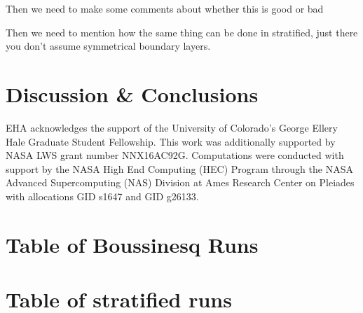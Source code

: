 \documentclass[aps, pre, onecolumn, nofootinbib, notitlepage, groupedaddress, amsfonts, amssymb, amsmath, longbibliography]{revtex4-1}
\begin{document}
Then we need to make some comments about whether this is good or bad

Then we need to mention how the same thing can be done in stratified, just there you don't
assume symmetrical boundary layers.





\section{Discussion \& Conclusions}
\label{sec:results}




\begin{acknowledgments}
EHA acknowledges the support of the University of Colorado's George 
Ellery Hale Graduate Student Fellowship.
This work was additionally supported by  NASA LWS grant number NNX16AC92G.  
Computations were conducted 
with support by the NASA High End Computing (HEC) Program through the NASA 
Advanced Supercomputing (NAS) Division at Ames Research Center on Pleiades
with allocations GID s1647 and GID g26133.
\end{acknowledgments}


\appendix
\section{Table of Boussinesq Runs}



\section{Table of stratified runs}



\end{document}
